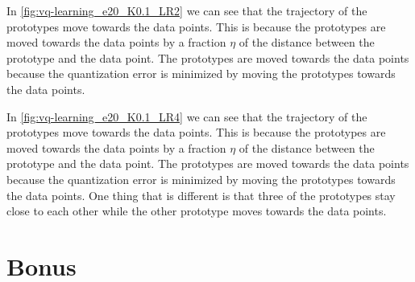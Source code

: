 \documentclass[twoside, a4paper, fleqn, reqno]{article}
\begin{document}
In \autoref{fig:vq-learning_e20_K0.1_LR2} we can see that the trajectory of the prototypes move towards the data points.
This is because the prototypes are moved towards the data points by a fraction $\eta$ of the distance between the prototype and the data point.
The prototypes are moved towards the data points because the quantization error is minimized by moving the prototypes towards the data points.

In \autoref{fig:vq-learning_e20_K0.1_LR4} we can see that the trajectory of the prototypes move towards the data points.
This is because the prototypes are moved towards the data points by a fraction $\eta$ of the distance between the prototype and the data point.
The prototypes are moved towards the data points because the quantization error is minimized by moving the prototypes towards the data points.
One thing that is different is that three of the prototypes stay close to each other while the other prototype moves towards the data points.

\section{Bonus}
\end{document}
